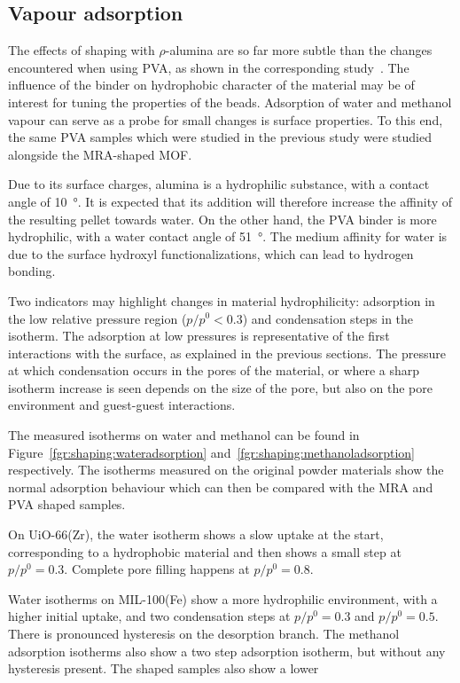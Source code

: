 
\subsection{Vapour adsorption}

The effects of shaping with \(\rho\)-alumina are 
so far more subtle than the changes encountered when using 
PVA, as shown in the corresponding 
study~\cite{chanutObservingEffectsShaping2016}.
The influence of the binder on hydrophobic character of the
material may be of interest for tuning the properties of the 
beads. Adsorption of water and methanol vapour can serve as 
a probe for small changes is surface properties.
To this end, the same PVA samples which were 
studied in the previous study were studied alongside 
the MRA-shaped MOF.

Due to its surface charges, alumina is a 
hydrophilic substance, with a contact 
angle of \SI{10}{\degree}. It is expected that its 
addition will therefore increase the affinity 
of the resulting pellet towards water. On the other hand,
the PVA binder is more hydrophilic, with a water contact
angle of \SI{51}{\degree}. The medium affinity for water
is due to the surface hydroxyl functionalizations, which
can lead to hydrogen bonding.

Two indicators may highlight 
changes in material hydrophilicity: adsorption in the 
low relative pressure region (\(p/p^0 < 0.3\)) and 
condensation steps in the isotherm. The adsorption at low
pressures is representative of the first interactions with the 
surface, as explained in the previous sections. The pressure 
at which condensation occurs in the pores of the material, or 
where a sharp isotherm increase is seen depends on the 
size of the pore, but also on the pore environment and 
guest-guest interactions.

The measured isotherms on water and methanol can be found
in Figure~\ref{fgr:shaping:wateradsorption} 
and~\ref{fgr:shaping:methanoladsorption} respectively.
The isotherms measured on the original powder materials 
show the normal adsorption behaviour which can then be 
compared with the MRA and PVA shaped samples. 

On UiO-66(Zr), the water isotherm shows a slow uptake at the 
start, corresponding to a hydrophobic material and then shows 
a small step at \(p/p^0 = 0.3\). Complete pore filling happens 
at \(p/p^0 = 0.8\).

Water isotherms on MIL-100(Fe) show a more hydrophilic environment,
with a higher initial uptake, and two condensation steps at 
\(p/p^0 = 0.3\) and \(p/p^0 = 0.5\). There is pronounced 
hysteresis on the desorption branch.
The methanol adsorption isotherms also show a two step adsorption
isotherm, but without any hysteresis present. The shaped samples 
also show a lower 

